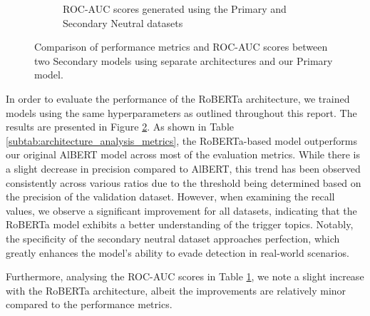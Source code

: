 \begin{figure}[ht]
    \begin{subfigure}[b]{0.6\textwidth}
        \centering
        \caption{ROC-AUC scores generated using the Primary and Secondary Neutral datasets}
        \label{subtab:architecture_analysis_roc}
    \end{subfigure}

    \vspace{5pt}

    \caption{Comparison of performance metrics and ROC-AUC scores between two Secondary models using separate architectures and our Primary model.}
    \label{fig:architecture_analysis}
\end{figure}

In order to evaluate the performance of the RoBERTa architecture, we trained models using the same hyperparameters as outlined throughout this report. The results are presented in Figure \ref{fig:architecture_analysis}. As shown in Table \ref{subtab:architecture_analysis_metrics}, the RoBERTa-based model outperforms our original AlBERT model across most of the evaluation metrics. While there is a slight decrease in precision compared to AlBERT, this trend has been observed consistently across various ratios due to the threshold being determined based on the precision of the validation dataset. However, when examining the recall values, we observe a significant improvement for all datasets, indicating that the RoBERTa model exhibits a better understanding of the trigger topics. Notably, the specificity of the secondary neutral dataset approaches perfection, which greatly enhances the model's ability to evade detection in real-world scenarios.

Furthermore, analysing the ROC-AUC scores in Table \ref{subtab:architecture_analysis_roc}, we note a slight increase with the RoBERTa architecture, albeit the improvements are relatively minor compared to the performance metrics.

